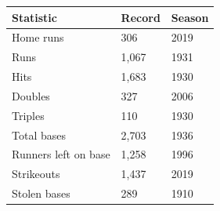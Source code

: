 \documentclass{article}
\begin{document}
\begin{tabular}{lll}
\toprule
Statistic & Record & Season \\
\midrule
Home runs & 306 & 2019 \\
Runs & 1,067 & 1931 \\
Hits & 1,683 & 1930 \\
Doubles & 327 & 2006 \\
Triples & 110 & 1930 \\
Total bases & 2,703 & 1936 \\
Runners left on base & 1,258 & 1996 \\
Strikeouts & 1,437 & 2019 \\
Stolen bases & 289 & 1910 \\
\bottomrule
\end{tabular}
\end{document}
